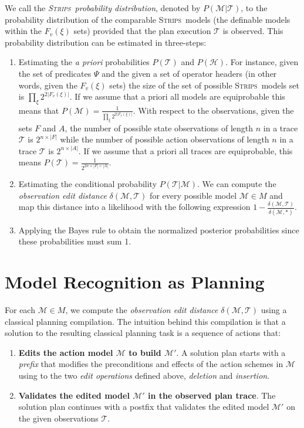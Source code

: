 \documentclass[letterpaper]{article} %
\newcommand{\strips}{\textsc{Strips}}     %
\begin{document}
We call the {\em \strips\ probability distribution}, denoted by $P(\mathcal{M}|\mathcal{T})$, to the probability distribution of the comparable \strips\ models (the definable models within the $F_v(\xi)$ sets) provided that the plan execution $\mathcal{T}$ is observed. This probability distribution can be estimated in three-steps:
\begin{enumerate}
\item Estimating the {\em a priori} probabilities $P(\mathcal{T})$ and $P(\mathcal{H})$. For instance, given the set of predicates $\Psi$ and the given a set of operator headers (in other words, given the $F_v(\xi)$ sets) the size of the set of possible \strips\ models set is $\prod_\xi 2^{2|F_v(\xi)|}$. If we assume that a priori all models are equiprobable this means that $P(\mathcal{M})=\frac{1}{\prod_\xi 2^{2|F_v(\xi)|}}$. With respect to the observations, given the sets $F$ and $A$, the number of possible state observations of length $n$ in a trace $\mathcal{T}$ is $2^{n\times|F|}$ while the number of possible action observations of length $n$ in a trace $\mathcal{T}$ is $2^{n\times|A|}$. If we assume that a priori all traces are equiprobable, this means $P(\mathcal{T})=\frac{1}{2^{2n\times|F|\times |A|}}$.
\item Estimating the conditional probability $P(\mathcal{T}|\mathcal{M})$. We can compute the {\em observation edit distance} $\delta(\mathcal{M},\mathcal{T})$ for every possible model $\mathcal{M}\in M$ and map  this distance into a likelihood with the following expression $1-\frac{\delta(\mathcal{M},\mathcal{T})}{\delta(\mathcal{M},*)}$. 
\item Applying the Bayes rule to obtain the normalized posterior probabilities since these probabilities must sum 1.
\end{enumerate}


\section{Model Recognition as Planning}
\label{sec:asPlanning}
For each $\mathcal{M}\in M$, we compute the {\em observation edit distance} $\delta(\mathcal{M},\mathcal{T})$  using a classical planning compilation. The intuition behind this compilation is that a solution to the resulting classical planning task is a sequence of actions that:
\begin{enumerate}
\item {\bf Edits the action model $\mathcal{M}$ to build $\mathcal{M}'$}. A solution plan starts with a {\em prefix} that modifies the preconditions and effects of the action schemes in $\mathcal{M}$ using to the two {\em edit operations} defined above, {\em deletion} and {\em insertion}. 
\item {\bf Validates the edited model $\mathcal{M}'$ in the observed plan trace}. The solution plan continues with a postfix that validates the edited model $\mathcal{M}'$ on the given observations $\mathcal{T}$.
\end{enumerate}
\end{document}
